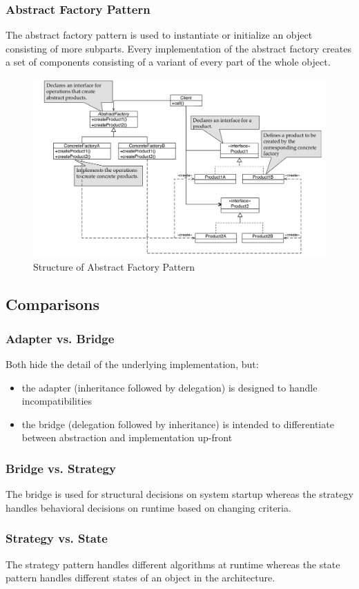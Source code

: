 \subsubsection{Abstract Factory Pattern}
The abstract factory pattern is used to instantiate or initialize an object consisting of more subparts.
Every implementation of the abstract factory creates a set of components consisting of a variant of every part of the whole object.

\begin{figure}[h]
	\centering
	\includegraphics[width=\linewidth]{images/pattern_abstract_factory.png}
	\caption{Structure of Abstract Factory Pattern}
\end{figure}
\newpage


\subsection{Comparisons}

\subsubsection{Adapter vs. Bridge}
Both hide the detail of the underlying implementation, but:
\begin{itemize}
   \item the adapter (inheritance followed by delegation) is designed to handle incompatibilities
   \item the bridge (delegation followed by inheritance) is intended to differentiate between abstraction and implementation up-front
 \end{itemize}

 \subsubsection{Bridge vs. Strategy}
 The bridge is used for structural decisions on system startup whereas the strategy handles behavioral decisions on runtime based on changing criteria.

\subsubsection{Strategy vs. State}
The strategy pattern handles different algorithms at runtime whereas the state pattern handles different states of an object in the architecture.

\newpage
